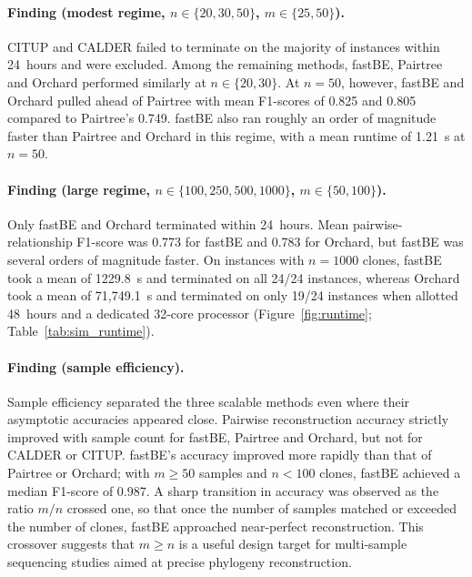 \documentclass[11pt]{article}
\begin{document}
\paragraph{Finding (modest regime, $n\in\{20,30,50\}$, $m\in\{25,50\}$).}
CITUP and CALDER failed to terminate on the majority of instances within 24~hours and were excluded. Among the remaining methods, fastBE, Pairtree and Orchard performed similarly at $n\in\{20,30\}$. At $n=50$, however, fastBE and Orchard pulled ahead of Pairtree with mean F1-scores of 0.825 and 0.805 compared to Pairtree's 0.749. fastBE also ran roughly an order of magnitude faster than Pairtree and Orchard in this regime, with a mean runtime of 1.21~s at $n=50$.

\paragraph{Finding (large regime, $n\in\{100,250,500,1000\}$, $m\in\{50,100\}$).}
Only fastBE and Orchard terminated within 24~hours. Mean pairwise-relationship F1-score was 0.773 for fastBE and 0.783 for Orchard, but fastBE was several orders of magnitude faster. On instances with $n=1000$ clones, fastBE took a mean of 1229.8~s and terminated on all 24/24 instances, whereas Orchard took a mean of 71{,}749.1~s and terminated on only 19/24 instances when allotted 48~hours and a dedicated 32-core processor (Figure~\ref{fig:runtime}; Table~\ref{tab:sim_runtime}).

\paragraph{Finding (sample efficiency).}
Sample efficiency separated the three scalable methods even where their asymptotic accuracies appeared close. Pairwise reconstruction accuracy strictly improved with sample count for fastBE, Pairtree and Orchard, but not for CALDER or CITUP. fastBE's accuracy improved more rapidly than that of Pairtree or Orchard; with $m\geq 50$ samples and $n<100$ clones, fastBE achieved a median F1-score of 0.987. A sharp transition in accuracy was observed as the ratio $m/n$ crossed one, so that once the number of samples matched or exceeded the number of clones, fastBE approached near-perfect reconstruction. This crossover suggests that $m \geq n$ is a useful design target for multi-sample sequencing studies aimed at precise phylogeny reconstruction.
\end{document}
